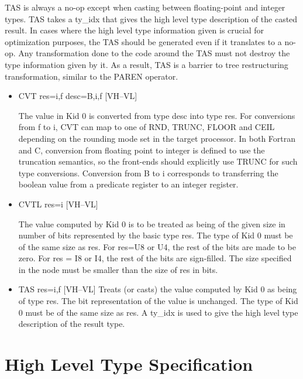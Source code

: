 \documentclass{article}
\begin{document}
%
TAS is always a no-op except when casting between floating-point
and integer types.
TAS takes a ty\_idx that gives the high level type description of
the casted result. In cases where the high level type information given
is crucial for optimization purposes, the TAS should be generated
even if it translates to a no-op. Any transformation done to the
code around the TAS must not destroy the type information given by
it. As a result, TAS is a barrier to tree restructuring transformation,
similar to the
%
PAREN operator.

\begin{itemize}
\item
{}%
CVT res=i,f desc=B,i,f \hfill [VH--VL]

The value in Kid 0 is converted from type desc into type res. For
conversions from f to i,
%
CVT can map to one of
%
RND,
%
TRUNC,
%
FLOOR and
%
CEIL depending on the
rounding mode set in the target processor. In both Fortran and C,
conversion from floating point to integer is defined to use
the truncation semantics, so the front-ends should explicitly use
%
TRUNC for such type conversions. Conversion from B to i corresponds
to transferring the boolean value from a predicate register to an
integer register. 

\item
{}%
CVTL res=i \hfill [VH--VL]

The value computed by Kid 0 is to be treated as being of the given
size in number of bits represented by the basic type res. The type
of Kid 0 must
be of the same size as res. For res=U8 or U4, the rest of the bits
are made to be zero. For res = I8 or I4, the rest of the bits are
sign-filled. The size specified in the node must be smaller than
the size of res in bits. \item  TAS res=i,f \hfill [VH--VL]
Treats (or casts) the value computed by Kid 0 as being of type res.
The bit representation of the value is unchanged. The type of Kid
0 must be of
the same size as res. A ty\_idx is used to give the high level type
description of the result type.

\end{itemize}

\section{High Level Type Specification}
\end{document}
